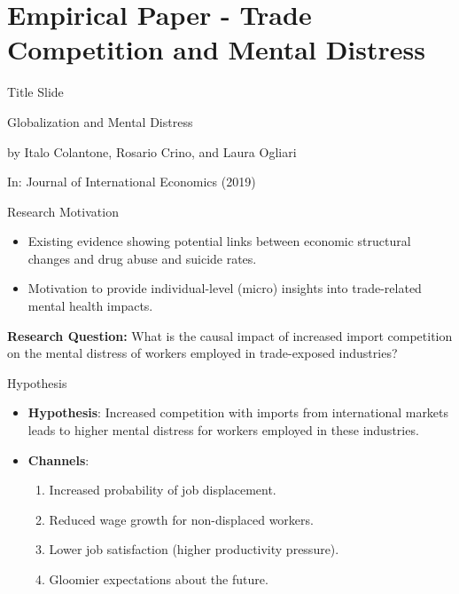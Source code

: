 \documentclass{beamer}
\begin{document}
\section{Empirical Paper - Trade Competition and Mental Distress}
\begin{frame}{Title Slide}
\begin{center}
    \begin{LARGE}
        Globalization and Mental Distress \\
    \end{LARGE}
    \begin{Large}
        by Italo Colantone, Rosario Crino, and Laura Ogliari \\
    \end{Large}
    In: Journal of International Economics (2019)
\end{center}
\end{frame}

\begin{frame}{Research Motivation}
    \begin{itemize}
        \item Existing evidence showing potential links between economic structural changes and drug abuse and suicide rates. %
        \item Motivation to provide individual-level (micro) insights into trade-related mental health impacts.
    \end{itemize}
    \begin{tcolorbox}
        \textbf{Research Question:} What is the causal impact of increased import competition on the mental distress of workers employed in trade-exposed industries?
    \end{tcolorbox}
\end{frame}


\begin{frame}{Hypothesis}
    \begin{itemize}
        \item \textbf{Hypothesis}: Increased competition with imports from international markets leads to higher mental distress for workers employed in these industries.
        \item \textbf{Channels}: \pause 
        \begin{enumerate}
            \item Increased probability of job displacement.
            \item Reduced wage growth for non-displaced workers.
            \item Lower job satisfaction (higher productivity pressure).
            \item Gloomier expectations about the future.
        \end{enumerate} 
    \end{itemize}
\end{frame}
\end{document}
